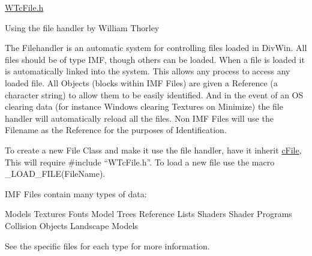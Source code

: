 \hyperlink{_w_tc_file_8h_source}{WTcFile.h}

Using the file handler by William Thorley

The Filehandler is an automatic system for controlling files loaded in DivWin. All files should be of type IMF, though others can be loaded. When a file is loaded it is automatically linked into the system. This allows any process to access any loaded file. All Objects (blocks within IMF Files) are given a Reference (a character string) to allow them to be easily identified. And in the event of an OS clearing data (for instance Windows clearing Textures on Minimize) the file handler will automatically reload all the files. Non IMF Files will use the Filename as the Reference for the purposes of Identification.

To create a new File Class and make it use the file handler, have it inherit \hyperlink{classc_file}{cFile}, This will require \#include “WTcFile.h”. To load a new file use the macro \_\-LOAD\_\-FILE(FileName).

IMF Files contain many types of data:

Models Textures Fonts Model Trees Reference Lists Shaders Shader Programs Collision Objects Landscape Models

See the specific files for each type for more information. 
